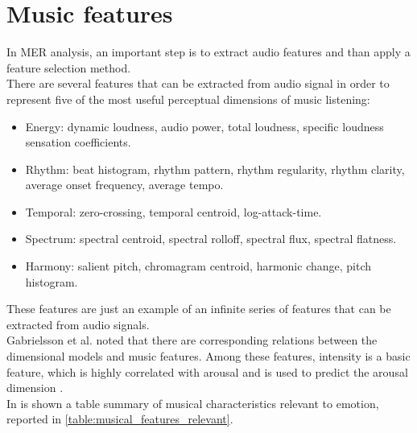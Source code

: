 \section{Music features}\label{music_features}
In MER analysis, an important step is to extract audio features and than apply a feature selection method.
\\
There are several features that can be extracted from audio signal in order to represent five of the most useful perceptual dimensions of music listening:
\begin{itemize}
	\item Energy: dynamic loudness, audio power, total loudness, specific loudness sensation coefficients.
	\item Rhythm: beat histogram, rhythm pattern, rhythm regularity, rhythm clarity, average onset frequency, average tempo.
	\item Temporal: zero-crossing, temporal centroid, log-attack-time.
	\item Spectrum: spectral centroid, spectral rolloff, spectral flux, spectral flatness.
	\item Harmony: salient pitch, chromagram centroid, harmonic change, pitch histogram.
\end{itemize}
These features are just an example of an infinite series of features that can be extracted from audio signals.
\\ \indent
Gabrielsson et al. \cite{gabrielsson2001influence} noted that there are corresponding relations between the dimensional models and music features. Among these features, intensity is a basic feature, which is highly correlated with arousal and is used to predict the arousal dimension \cite{zhang2017feature}.
\\
In \cite{panda2018novel} is shown a table summary of musical characteristics relevant to emotion, reported in \ref{table:musical_features_relevant}.
